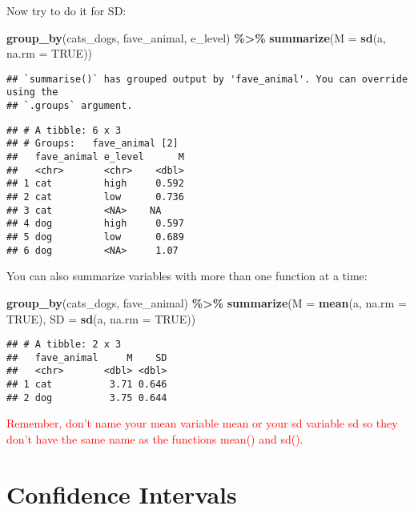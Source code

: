 \documentclass[
]{article}
\newenvironment{Shaded}{\begin{snugshade}}{\end{snugshade}}
\newcommand{\AttributeTok}[1]{\textcolor[rgb]{0.13,0.29,0.53}{#1}}
\newcommand{\ConstantTok}[1]{\textcolor[rgb]{0.56,0.35,0.01}{#1}}
\newcommand{\FunctionTok}[1]{\textcolor[rgb]{0.13,0.29,0.53}{\textbf{#1}}}
\newcommand{\NormalTok}[1]{#1}
\newcommand{\SpecialCharTok}[1]{\textcolor[rgb]{0.81,0.36,0.00}{\textbf{#1}}}
\begin{document}
Now try to do it for SD:

\begin{Shaded}
\begin{Highlighting}[]
\FunctionTok{group\_by}\NormalTok{(cats\_dogs, fave\_animal, e\_level) }\SpecialCharTok{\%\textgreater{}\%} 
  \FunctionTok{summarize}\NormalTok{(}\AttributeTok{M =} \FunctionTok{sd}\NormalTok{(a, }\AttributeTok{na.rm =} \ConstantTok{TRUE}\NormalTok{))}
\end{Highlighting}
\end{Shaded}

\begin{verbatim}
## `summarise()` has grouped output by 'fave_animal'. You can override using the
## `.groups` argument.
\end{verbatim}

\begin{verbatim}
## # A tibble: 6 x 3
## # Groups:   fave_animal [2]
##   fave_animal e_level      M
##   <chr>       <chr>    <dbl>
## 1 cat         high     0.592
## 2 cat         low      0.736
## 3 cat         <NA>    NA    
## 4 dog         high     0.597
## 5 dog         low      0.689
## 6 dog         <NA>     1.07
\end{verbatim}

You can also summarize variables with more than one function at a time:

\begin{Shaded}
\begin{Highlighting}[]
\FunctionTok{group\_by}\NormalTok{(cats\_dogs, fave\_animal) }\SpecialCharTok{\%\textgreater{}\%} 
  \FunctionTok{summarize}\NormalTok{(}\AttributeTok{M =} \FunctionTok{mean}\NormalTok{(a, }\AttributeTok{na.rm =} \ConstantTok{TRUE}\NormalTok{), }\AttributeTok{SD =} \FunctionTok{sd}\NormalTok{(a, }\AttributeTok{na.rm =} \ConstantTok{TRUE}\NormalTok{)) }
\end{Highlighting}
\end{Shaded}

\begin{verbatim}
## # A tibble: 2 x 3
##   fave_animal     M    SD
##   <chr>       <dbl> <dbl>
## 1 cat          3.71 0.646
## 2 dog          3.75 0.644
\end{verbatim}

\textcolor{red}{Remember, don't name your mean variable mean or your sd variable sd so they don't have the same name as the functions mean() and sd().}

\hypertarget{confidence-intervals}{%
\section{Confidence Intervals}\label{confidence-intervals}}
\end{document}
